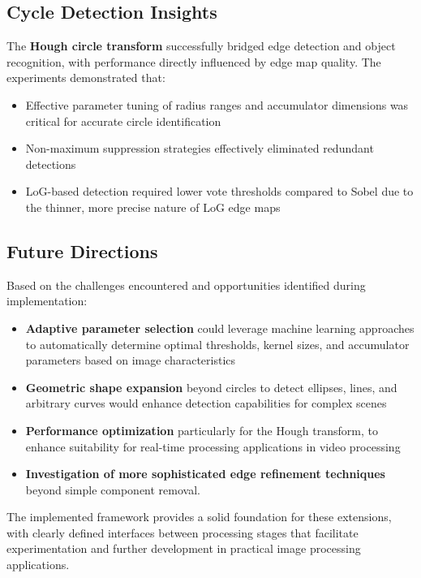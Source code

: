\documentclass[12pt,a4paper]{article}
\begin{document}
\subsection*{Cycle Detection Insights}

The \textbf{Hough circle transform} successfully bridged edge detection and object recognition, with performance directly influenced by edge map quality. The experiments demonstrated that:

\begin{itemize}
    \item Effective parameter tuning of radius ranges and accumulator dimensions was critical for accurate circle identification
    \item Non-maximum suppression strategies effectively eliminated redundant detections
    \item LoG-based detection required lower vote thresholds compared to Sobel due to the thinner, more precise nature of LoG edge maps
\end{itemize}


\subsection*{Future Directions}

Based on the challenges encountered and opportunities identified during implementation:

\begin{itemize}
    \item \textbf{Adaptive parameter selection} could leverage machine learning approaches to automatically determine optimal thresholds, kernel sizes, and accumulator parameters based on image characteristics
    \item \textbf{Geometric shape expansion} beyond circles to detect ellipses, lines, and arbitrary curves would enhance detection capabilities for complex scenes
    \item \textbf{Performance optimization}  particularly for the Hough transform, to enhance suitability for real-time processing applications in video processing 
    \item \textbf{Investigation of more sophisticated edge refinement techniques} beyond simple component removal.

    
\end{itemize}

The implemented framework provides a solid foundation for these extensions, with clearly defined interfaces between processing stages that facilitate experimentation and further development in practical image processing applications.
\end{document}

